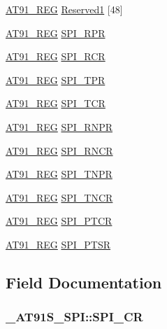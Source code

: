 \begin{CompactItemize}
\item 
\hyperlink{AT91SAM7X256_8h_712ad5a1ac1bd02f3e95a7526c283ce1}{AT91\_\-REG} \hyperlink{struct__AT91S__SPI_324199fd9f95b29e321b856b9ac9c277}{Reserved1} \mbox{[}48\mbox{]}
\item 
\hyperlink{AT91SAM7X256_8h_712ad5a1ac1bd02f3e95a7526c283ce1}{AT91\_\-REG} \hyperlink{struct__AT91S__SPI_4a254f51f4a9ba0d9950b98e21477a96}{SPI\_\-RPR}
\item 
\hyperlink{AT91SAM7X256_8h_712ad5a1ac1bd02f3e95a7526c283ce1}{AT91\_\-REG} \hyperlink{struct__AT91S__SPI_6227f4ced23603141013b0a810c097fc}{SPI\_\-RCR}
\item 
\hyperlink{AT91SAM7X256_8h_712ad5a1ac1bd02f3e95a7526c283ce1}{AT91\_\-REG} \hyperlink{struct__AT91S__SPI_742551597beffa41c6c784fded134ca6}{SPI\_\-TPR}
\item 
\hyperlink{AT91SAM7X256_8h_712ad5a1ac1bd02f3e95a7526c283ce1}{AT91\_\-REG} \hyperlink{struct__AT91S__SPI_a8d667698c1d6f505056fe740af05e81}{SPI\_\-TCR}
\item 
\hyperlink{AT91SAM7X256_8h_712ad5a1ac1bd02f3e95a7526c283ce1}{AT91\_\-REG} \hyperlink{struct__AT91S__SPI_feca3684d605f359cd9e9ea9b1e546a5}{SPI\_\-RNPR}
\item 
\hyperlink{AT91SAM7X256_8h_712ad5a1ac1bd02f3e95a7526c283ce1}{AT91\_\-REG} \hyperlink{struct__AT91S__SPI_64a6454a4fb96b9495b0d8ecbc9b944b}{SPI\_\-RNCR}
\item 
\hyperlink{AT91SAM7X256_8h_712ad5a1ac1bd02f3e95a7526c283ce1}{AT91\_\-REG} \hyperlink{struct__AT91S__SPI_c31966a9399c2d126b9b0caa2708eeb5}{SPI\_\-TNPR}
\item 
\hyperlink{AT91SAM7X256_8h_712ad5a1ac1bd02f3e95a7526c283ce1}{AT91\_\-REG} \hyperlink{struct__AT91S__SPI_24be51d019e6c3acfaddc5c6d9b168fb}{SPI\_\-TNCR}
\item 
\hyperlink{AT91SAM7X256_8h_712ad5a1ac1bd02f3e95a7526c283ce1}{AT91\_\-REG} \hyperlink{struct__AT91S__SPI_3a8924d153f0984fde5c27c4203bab08}{SPI\_\-PTCR}
\item 
\hyperlink{AT91SAM7X256_8h_712ad5a1ac1bd02f3e95a7526c283ce1}{AT91\_\-REG} \hyperlink{struct__AT91S__SPI_185ef5c1beda2534149dbfd1861597e0}{SPI\_\-PTSR}
\end{CompactItemize}


\subsection{Field Documentation}
\hypertarget{struct__AT91S__SPI_5d6553c05d0a9468b53a3521e9dc2d03}{
\subsubsection{ {\bf \_\-AT91S\_\-SPI::SPI\_\-CR}}}
\label{struct__AT91S__SPI_5d6553c05d0a9468b53a3521e9dc2d03}





